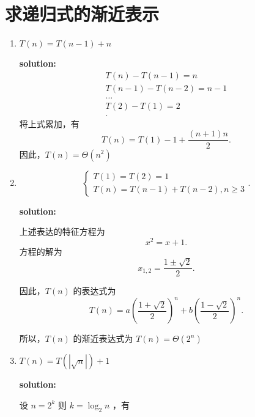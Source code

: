 \documentclass[UTF8]{ctexart}
\begin{document}
\section{求递归式的渐近表示}%
\label{sec:求递归式的渐近表示}

\begin{enumerate}
    \item $ T\left( n \right) = T \left( n-1 \right) + n  $ 

        \textbf{solution:}
        \begin{align*}
            T\left( n \right)  - T\left( n-1 \right)  = n  \\
            T\left( n-1 \right)  - T\left( n-2 \right)   = n-1  \\
            \ldots \\
            T\left( 2 \right)  - T\left( 1 \right)   = 2  \\
        .\end{align*}
        将上式累加，有
        \[
            T\left( n \right) = T\left( 1 \right) - 1 +  \frac{\left( n+1 \right)n  }{2} 
        .\] 
    因此，$ T\left( n \right) = \Theta \left( n^2 \right)  $

    \item   
        \[
            \begin{cases}
                T\left( 1 \right) = T\left( 2 \right) = 1   \\
                T\left( n \right)  = T\left( n-1 \right) + T\left( n-2 \right) , n \ge 3
            \end{cases}
        .\] 

        \textbf{solution:}

        上述表达的特征方程为  \[
        x^{2} = x + 1
        .\] 
    方程的解为 \[
           x_{1,2} =  \frac{1 \pm \sqrt{2} }{2} 
    .\] 

因此，$ T\left( n \right)  $ 的表达式为 \[
    T\left( n \right)  = a \left(  \frac{1+\sqrt{2} }{2}\right) ^{n} + b \left(  \frac{1-\sqrt{2} }{2} \right)^{n}
.\] 

所以，$ T\left( n \right)  $ 的渐近表达式为  $ T\left( n \right)  = \Theta\left( 2^{n} \right) $

    \item $ T\left( n \right)  = T\left( \left| \sqrt{n}  \right|  \right) + 1 $

        \textbf{solution:}

        设 $ n = 2^{k} $ 则 $ k = \log_{2} n $ ，有 


\end{enumerate}
\end{document}
